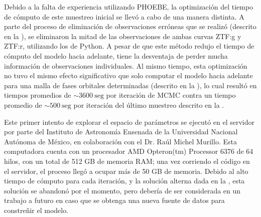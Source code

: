 Debido a la falta de experiencia utilizando PHOEBE, la optimización del tiempo
de cómputo de este muestreo inicial se llevó a cabo de una manera distinta. A
parte del proceso de eliminación de observaciones erróneas que se realizó
(descrito en la
),
se eliminaron la mitad de las observaciones de ambas curvas ZTF:g y ZTF:r,
utilizando los  de Python. A pesar de que este método redujo el
tiempo de cómputo del modelo hacia adelante, tiene la desventaja de perder mucha
información de observaciones individuales. Al mismo tiempo, esta optimización no
tuvo el mismo efecto significativo que solo computar el modelo hacia adelante
para una malla de fases orbitales determinadas (descrito en la
), lo cual
resultó en tiempos promedios de $\sim 3600 \ \mathrm{seg}$ por iteración de MCMC
contra un tiempo promedio de $\sim 500 \ \mathrm{seg}$ por iteración del último
muestreo descrito en la . 

Este primer intento de explorar el espacio de parámetros se ejecutó en el
servidor  por parte del Instituto de Astronomía Ensenada de la
Universidad Nacional Autónoma de México, en colaboración con el Dr. Raúl Michel
Murillo. Esta computadora cuenta con un procesador AMD Opteron(tm) Processor
6376 de 64 hilos, con un total de 512 GB de memoria RAM; una vez corriendo el
código en el servidor, el proceso llegó a ocupar más de 50 GB de memoria. Debido
al alto tiempo de cómputo para cada iteración, y la solución alterna dada en la
, esta
solución se abandonó por el momento, pero debería de ser considerada en un
trabajo a futuro en caso que se obtenga una nueva fuente de datos para
constreñir el modelo. 